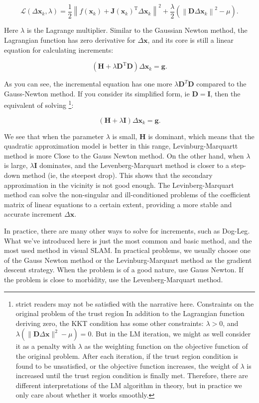 \begin{equation}
\mathcal{L}(\Delta \bm{x}_k, \lambda)= \frac{1}{2} {\left\| {f\left( \bm{x}_k \right) + \bm{J} \left( \bm{x}_k \right)^\mathrm{T} \Delta \bm{x}_k} \right\|^2} + \frac{\lambda}{2} \left( \left\| \bm{D} \Delta \bm{x}_k \right\|^2 - \mu \right).
\end{equation}

Here $\lambda$ is the Lagrange multiplier. Similar to the Gaussian Newton method, the Lagrangian function has zero derivative for $\Delta \bm{x}$, and its core is still a linear equation for calculating increments:

\begin{equation}
\left( \bm{H} +\lambda \bm{D}^\mathrm{T} \bm{D} \right) \Delta \bm{x}_k = \bm{g}.
\end{equation}

As you can see, the incremental equation has one more $\lambda \bm{D}^T \bm{D}$ compared to the Gauss-Newton method. If you consider its simplified form, ie $\bm{D}=\bm{I}$, then the equivalent of solving \footnote{strict readers may not be satisfied with the narrative here. Constraints on the original problem of the trust region In addition to the Lagrangian function deriving zero, the KKT condition has some other constraints: $\lambda>0$, and $\lambda(\|\bm{D} \Delta \bm{x}\|^2-\mu)=0$. But in the LM iteration, we might as well consider it as a penalty with $\lambda$ as the weighting function on the objective function of the original problem. After each iteration, if the trust region condition is found to be unsatisfied, or the objective function increases, the weight of $\lambda$ is increased until the trust region condition is finally met. Therefore, there are different interpretations of the LM algorithm in theory, but in practice we only care about whether it works smoothly. }:

\begin{displaymath}
\left( \bm{H} +\lambda \bm{I} \right) \Delta \bm{x}_k = \bm{g}.
\end{displaymath}

We see that when the parameter $\lambda$ is small, $\bm{H}$ is dominant, which means that the quadratic approximation model is better in this range, Levinburg-Marquartt method is more Close to the Gauss Newton method. On the other hand, when $\lambda$ is large, $\lambda \bm{I}$ dominates, and the Levenberg-Marquart method is closer to a step-down method (ie, the steepest drop). This shows that the secondary approximation in the vicinity is not good enough. The Levinberg-Marquart method can solve the non-singular and ill-conditioned problems of the coefficient matrix of linear equations to a certain extent, providing a more stable and accurate increment $\Delta \bm{x} $.

In practice, there are many other ways to solve for increments, such as Dog-Leg\cite{Nocedal2006}. What we've introduced here is just the most common and basic method, and the most used method in visual SLAM. In practical problems, we usually choose one of the Gauss Newton method or the Levinburg-Marquart method as the gradient descent strategy. When the problem is of a good nature, use Gauss Newton. If the problem is close to morbidity, use the Levenberg-Marquart method.
